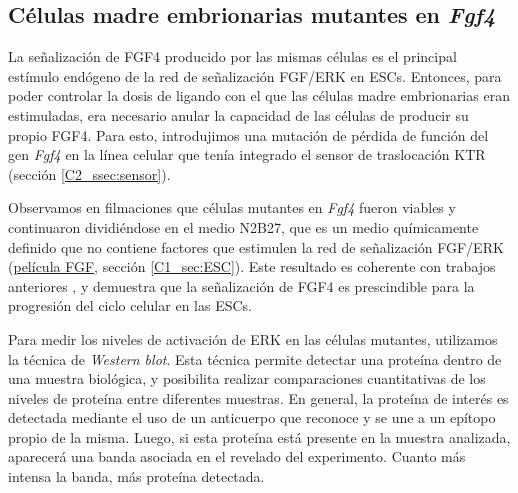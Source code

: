 \documentclass[./main.tex]{subfiles}
\begin{document}
\subsection{Células madre embrionarias mutantes en \textit{Fgf4}}
\label{sec:c2_KO}


La señalización de FGF4 producido por las mismas células es el principal estímulo endógeno de la red de señalización FGF/ERK en ESCs. Entonces, para poder controlar la dosis de ligando con el que las células madre embrionarias eran estimuladas, era necesario anular la capacidad de las células de producir su propio FGF4. Para esto, introdujimos una mutación de pérdida de función del gen \textit{Fgf4} en la línea celular que tenía integrado el sensor de traslocación KTR (sección \ref{C2_ssec:sensor}). 


Observamos en filmaciones que células mutantes en \textit{Fgf4} fueron viables y continuaron dividiéndose en el medio N2B27, que es un medio químicamente definido que no contiene factores que estimulen la red de señalización FGF/ERK (\href{http://movie.biologists.com/video/10.1242/dev.199710/video-2}{película FGF}, sección \ref{C1_sec:ESC}). Este resultado es coherente con trabajos anteriores \cite{Kunath2007}, y demuestra que la señalización de FGF4 es prescindible para la progresión del ciclo celular en las ESCs. 


Para medir los niveles de activación de ERK en las células mutantes, utilizamos la técnica de \textit{\textit{Western blot}}.
 Esta técnica permite detectar una proteína dentro de una muestra biológica, y posibilita realizar comparaciones cuantitativas de los niveles de proteína entre diferentes muestras. En general, la proteína de interés es detectada mediante el uso de un anticuerpo que reconoce y se une a un epítopo propio de la misma. Luego, si esta proteína está presente en la muestra analizada, aparecerá una banda asociada en el revelado del experimento. Cuanto más intensa la banda, más proteína detectada.  
\end{document}
